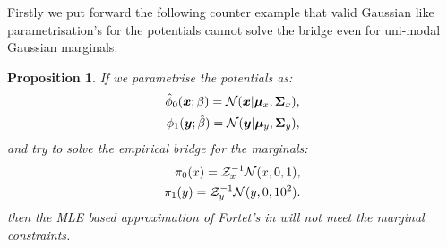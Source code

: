\documentclass[a4paper,12pt,twoside,openright]{report}
\newtheorem{proposition}{Proposition}
\theoremstyle{definition}
\begin{document}
Firstly we put forward the following counter example that valid Gaussian like parametrisation's for the potentials cannot solve the bridge even for uni-modal Gaussian marginals:
\begin{proposition}
If we parametrise the potentials as:
\begin{align}
{\hat{\phi}}_0( {\bm{x}} ; \beta) =  {\mathcal{N}}({\bm{x}} | {\bm{\mu}}_x, {\bm{\Sigma}}_x), \\
\phi_1( {\bm{y}} ; \hat{\beta}) =  {\mathcal{N}}({\bm{y}} | {\bm{\mu}}_y, {\bm{\Sigma}}_y) ,
\end{align}
and try to solve the empirical bridge for the marginals:
\begin{align*}
    \pi_0(x) =  \mathcal{Z}_x^{-1}{\mathcal{N}}(x,0, 1), \\
    \pi_1(y) = \mathcal{Z}_y^{-1} {\mathcal{N}}(y,0, 10^2) .
\end{align*}
then the MLE based approximation of Fortet's in \cite{pavon2018data} will not meet the marginal constraints.
\end{proposition}
\end{document}
